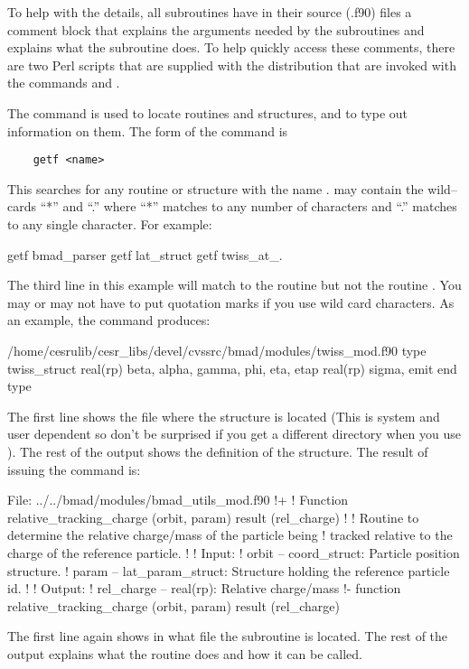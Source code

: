 {{{{{{To help with the details, all \bmad subroutines have in their source (.f90)
files a comment block that explains the arguments needed by the
subroutines and explains what the subroutine does. To help quickly
access these comments, there are two Perl scripts that are supplied
with the \bmad distribution that are invoked with the commands
 and .

The  command is used to locate routines and structures, and
to type out information on them.  The form of the command is
\begin{verbatim}
    getf <name>
\end{verbatim}
This searches for any routine or structure with the name
.  may contain the wild--cards ``*'' and ``.'' where
``*'' matches to any number of characters and ``.'' matches to any
single character. For example:
\begin{example}
    getf bmad_parser
    getf lat_struct
    getf twiss_at_.
\end{example}
The third line in this example will match to the routine
 but not the routine . You may or
may not have to put quotation marks if you use wild card characters.
As an example, the command  produces:
\begin{example}
  /home/cesrulib/cesr_libs/devel/cvssrc/bmad/modules/twiss_mod.f90
    type twiss_struct
      real(rp) beta, alpha, gamma, phi, eta, etap
      real(rp) sigma, emit
    end type
\end{example}
The first line shows the file where the structure is located (This is
system and user dependent so don't be surprised if you get a different
directory when you use ). The rest of the output shows the
definition of the  structure.  The result of issuing
the command  is:
\begin{example}
  File: ../../bmad/modules/bmad_utils_mod.f90
  !+
  ! Function relative_tracking_charge (orbit, param) result (rel_charge)
  !
  ! Routine to determine the relative charge/mass of the particle being
  ! tracked relative to the charge of the reference particle.
  !
  ! Input:
  !   orbit -- coord_struct: Particle position structure.
  !   param -- lat_param_struct: Structure holding the reference particle id.
  !
  ! Output:
  !   rel_charge -- real(rp): Relative charge/mass
  !-
  function relative_tracking_charge (orbit, param) result (rel_charge)
\end{example}
The first line again shows in what file the subroutine is located.
The rest of the output explains what the routine does and how it
can be called.

}}}}}}
